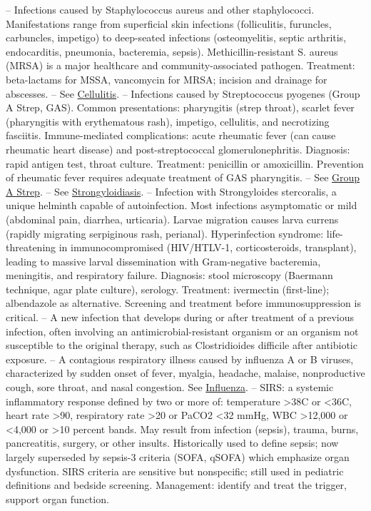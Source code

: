 -- Infections caused by Staphylococcus aureus and other staphylococci. Manifestations range from superficial skin infections (folliculitis, furuncles, carbuncles, impetigo) to deep-seated infections (osteomyelitis, septic arthritis, endocarditis, pneumonia, bacteremia, sepsis). Methicillin-resistant S. aureus (MRSA) is a major healthcare and community-associated pathogen. Treatment: beta-lactams for MSSA, vancomycin for MRSA; incision and drainage for abscesses.
-- See \hyperlink{Cellulitis}{Cellulitis}.
-- Infections caused by Streptococcus pyogenes (Group A Strep, GAS). Common presentations: pharyngitis (strep throat), scarlet fever (pharyngitis with erythematous rash), impetigo, cellulitis, and necrotizing fasciitis. Immune-mediated complications: acute rheumatic fever (can cause rheumatic heart disease) and post-streptococcal glomerulonephritis. Diagnosis: rapid antigen test, throat culture. Treatment: penicillin or amoxicillin. Prevention of rheumatic fever requires adequate treatment of GAS pharyngitis.
-- See \hyperlink{Group A Strep}{Group A Strep}.
-- See \hyperlink{Strongyloidiasis}{Strongyloidiasis}.
-- Infection with Strongyloides stercoralis, a unique helminth capable of autoinfection. Most infections asymptomatic or mild (abdominal pain, diarrhea, urticaria). Larvae migration causes larva currens (rapidly migrating serpiginous rash, perianal). Hyperinfection syndrome: life-threatening in immunocompromised (HIV/HTLV-1, corticosteroids, transplant), leading to massive larval dissemination with Gram-negative bacteremia, meningitis, and respiratory failure. Diagnosis: stool microscopy (Baermann technique, agar plate culture), serology. Treatment: ivermectin (first-line); albendazole as alternative. Screening and treatment before immunosuppression is critical.
-- A new infection that develops during or after treatment of a previous infection, often involving an antimicrobial-resistant organism or an organism not susceptible to the original therapy, such as Clostridioides difficile after antibiotic exposure.
-- A contagious respiratory illness caused by influenza A or B viruses, characterized by sudden onset of fever, myalgia, headache, malaise, nonproductive cough, sore throat, and nasal congestion. See \hyperlink{Influenza}{Influenza}.
-- SIRS: a systemic inflammatory response defined by two or more of: temperature >38C or <36C, heart rate >90, respiratory rate >20 or PaCO2 <32 mmHg, WBC >12,000 or <4,000 or >10 percent bands. May result from infection (sepsis), trauma, burns, pancreatitis, surgery, or other insults. Historically used to define sepsis; now largely superseded by sepsis-3 criteria (SOFA, qSOFA) which emphasize organ dysfunction. SIRS criteria are sensitive but nonspecific; still used in pediatric definitions and bedside screening. Management: identify and treat the trigger, support organ function.
